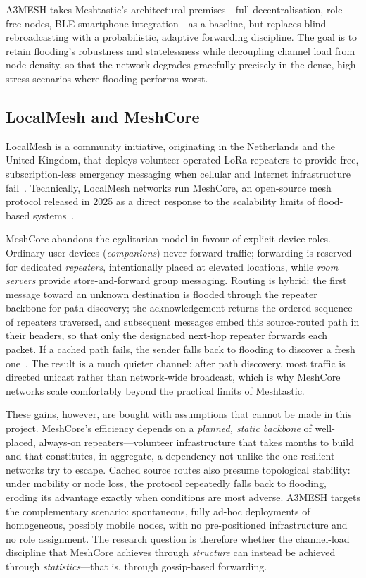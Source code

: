 \documentclass[english,bachelor]{tfgitic}[2026/01/22]
\begin{document}
A3MESH takes Meshtastic's architectural premises---full decentralisation, role-free nodes, BLE smartphone integration---as a baseline, but replaces blind rebroadcasting with a probabilistic, adaptive forwarding discipline. The goal is to retain flooding's robustness and statelessness while decoupling channel load from node density, so that the network degrades gracefully precisely in the dense, high-stress scenarios where flooding performs worst.

\subsection{LocalMesh and MeshCore}
\label{subsec:localmesh}

LocalMesh is a community initiative, originating in the Netherlands and the United Kingdom, that deploys volunteer-operated LoRa repeaters to provide free, subscription-less emergency messaging when cellular and Internet infrastructure fail~\cite{localmesh2026}. Technically, LocalMesh networks run MeshCore, an open-source mesh protocol released in 2025 as a direct response to the scalability limits of flood-based systems~\cite{meshcore2025}.

MeshCore abandons the egalitarian model in favour of explicit device roles. Ordinary user devices (\emph{companions}) never forward traffic; forwarding is reserved for dedicated \emph{repeaters}, intentionally placed at elevated locations, while \emph{room servers} provide store-and-forward group messaging. Routing is hybrid: the first message toward an unknown destination is flooded through the repeater backbone for path discovery; the acknowledgement returns the ordered sequence of repeaters traversed, and subsequent messages embed this source-routed path in their headers, so that only the designated next-hop repeater forwards each packet. If a cached path fails, the sender falls back to flooding to discover a fresh one~\cite{meshcore2025}. The result is a much quieter channel: after path discovery, most traffic is directed unicast rather than network-wide broadcast, which is why MeshCore networks scale comfortably beyond the practical limits of Meshtastic.

These gains, however, are bought with assumptions that cannot be made in this project. MeshCore's efficiency depends on a \emph{planned, static backbone} of well-placed, always-on repeaters---volunteer infrastructure that takes months to build and that constitutes, in aggregate, a dependency not unlike the one resilient networks try to escape. Cached source routes also presume topological stability: under mobility or node loss, the protocol repeatedly falls back to flooding, eroding its advantage exactly when conditions are most adverse. A3MESH targets the complementary scenario: spontaneous, fully ad-hoc deployments of homogeneous, possibly mobile nodes, with no pre-positioned infrastructure and no role assignment. The research question is therefore whether the channel-load discipline that MeshCore achieves through \emph{structure} can instead be achieved through \emph{statistics}---that is, through gossip-based forwarding.
\end{document}
